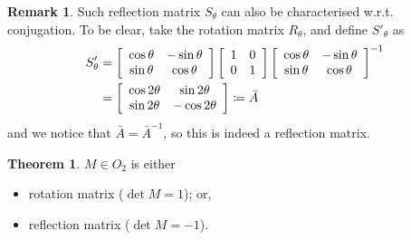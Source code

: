 \documentclass[11pt]{amsart} %
\theoremstyle{definition}
\newtheorem{theorem}[definition]{Theorem}
\theoremstyle{definition}
\newtheorem{remark}[definition]{Remark}
\numberwithin{equation}{section}
\begin{document}
\begin{remark}
	Such reflection matrix $S_{\theta}$ can also be characterised w.r.t. conjugation. To be clear, take the rotation matrix $R_\theta$, and define $S'_{\theta}$ as
	\begin{align*}
		S'_{\theta} &= \left[ \begin{array}{ c c }  \cos \theta &  - \sin \theta \\ \sin \theta  & \cos \theta  \end{array}\right] \left[ \begin{array}{ c c }  1 &  0 \\ 0  & 1  \end{array}\right]  \left[ \begin{array}{ c c }  \cos \theta &  - \sin \theta \\ \sin \theta  & \cos \theta  \end{array}\right]^{-1}  \\
		&= \left[ \begin{array}{ c c }  \cos 2 \theta &  \sin 2 \theta \\ \sin 2 \theta  & - \cos 2 \theta  \end{array}\right]  \coloneqq \bar{A}
	\end{align*}
	and we notice that $\bar{A}= \bar{A}^{-1}$, so this is indeed a reflection matrix.
\end{remark}

\begin{theorem}
	\label{matrixtheoremO2}
	$M \in O_2$ is either
	\begin{itemize}%
		\item rotation matrix ($\det M =1$); or,
		\item reflection matrix ($\det M =-1$).
	\end{itemize} 
\end{theorem}
\end{document}
